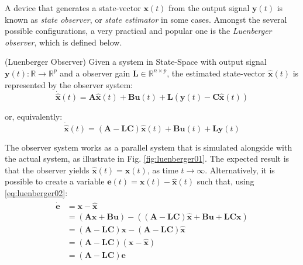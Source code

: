 \documentclass[a4paper,11pt]{book}
\numberwithin{figure}{chapter}
\numberwithin{equation}{chapter}
\numberwithin{table}{chapter}
\theoremstyle{definition}
\newtheorem{definition}{Definition}[chapter]
\newcounter{boxed-theorem}
\newcounter{boxed-definition}
\newenvironment{boxed-definition}[1]
{\begin{shaded} \begin{definition}{#1}}
{\end{definition} \end{shaded}}
\begin{document}
A device that generates a state-vector $\bm{x}(t)$ from the output signal $\bm{y}(t)$ is known as \textit{state observer}, or \textit{state estimator} in some cases. Amongst the several possible configurations, a very practical and popular one is the \textit{Luenberger observer}, which is defined below.

\begin{boxed-definition}{(Luenberger Observer)} \label{def:luenberger}
	Given a system in State-Space with output signal $\bm{y}(t) : \mathbb{R} \rightarrow \mathbb{R}^p$ and a observer gain $\bm{L} \in \mathbb{R}^{n \times p}$, the estimated state-vector $\hat{\bm{x}}(t)$ is represented by the observer system:
	\begin{equation}
		\dot{\hat{\bm{x}}}(t) = \bm{A} \hat{\bm{x}}(t) + \bm{B} \bm{u}(t) + \bm{L} \left( \bm{y}(t) - \bm{C} \hat{\bm{x}}(t) \right)
	\end{equation}
	
	\noindent or, equivalently:
	\begin{equation} \label{eq:luenberger02}
		\dot{\hat{\bm{x}}}(t) = \left( \bm{A} - \bm{L} \bm{C} \right) \hat{\bm{x}}(t) + \bm{B} \bm{u}(t) + \bm{L} \bm{y}(t)
	\end{equation}
\end{boxed-definition}

The observer system works as a parallel system that is simulated alongside with the actual system, as illustrate in Fig. \ref{fig:luenberger01}. The expected result is that the observer yields $\hat{\bm{x}}(t) = \bm{x}(t)$, as time $t \to \infty$. Alternatively, it is possible to create a variable $\bm{e}(t) = \bm{x}(t) - \hat{\bm{x}}(t)$ such that, using \eqref{eq:luenberger02}:
\begin{align}
\begin{split}
	\dot{\bm{e}} &= \bm{x} - \hat{\bm{x}} \\ 
		&= \left( \bm{A} \bm{x} + \bm{B} \bm{u} \right) - \left( \left( \bm{A} - \bm{L} \bm{C} \right) \hat{\bm{x}} + \bm{B} \bm{u} + \bm{L} \bm{C} \bm{x} \right) \\
		&= \left( \bm{A} - \bm{L} \bm{C} \right) \bm{x} - \left( \bm{A} - \bm{L} \bm{C} \right) \hat{\bm{x}} \\
		&= \left( \bm{A} - \bm{L} \bm{C} \right) \left( \bm{x} - \hat{\bm{x}} \right) \\
		&= \left( \bm{A} - \bm{L} \bm{C} \right) \bm{e}
\end{split}
\end{align}
\end{document}
